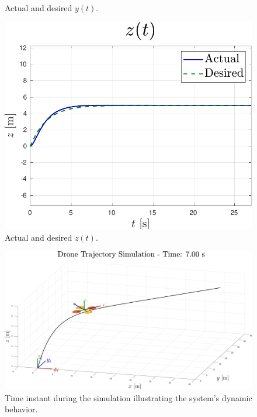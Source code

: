 \documentclass[main]{subfiles}
\begin{document}
\begin{figure}
\begin{minipage}[b]{0.45\textwidth}
        \caption[Tracking in Y-axis]{Actual and desired $y(t)$.}
        \label{fig:pid_y}
    \end{minipage}
    \begin{minipage}[b]{0.48\textwidth}
        \vspace{0.4cm}
        \centering
        \includegraphics[width=\textwidth]{images/pid_z.pdf}
        \caption[Tracking in Z-axis]{Actual and desired $z(t)$.}
        \label{fig:pid_z}
    \end{minipage}
\end{figure}

\begin{figure}
    \centering
    \includegraphics[width=\textwidth]{images/pid_sim.pdf}
    \caption[Simulation Overview]{Time instant during the simulation illustrating the system's dynamic behavior.}
    \label{fig:pid_sim}
\end{figure}
\end{document}
